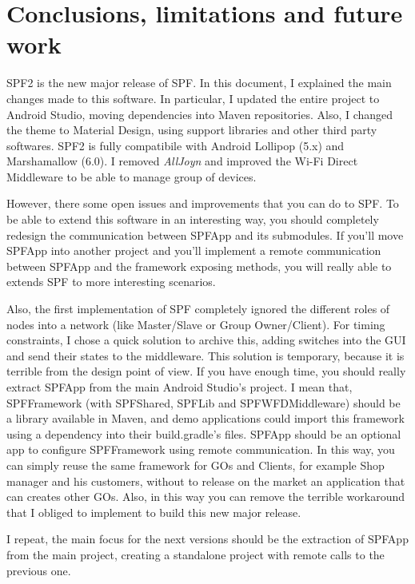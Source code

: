 \chapter{Conclusions, limitations and future work}
\label{conclusion}

SPF2 is the new major release of SPF. In this document, I explained the main changes made to this software. In particular, I updated the entire project to Android Studio, moving dependencies into Maven repositories. Also, I changed the theme to Material Design, using support libraries and other third party softwares. SPF2 is fully compatibile with Android Lollipop (5.x) and Marshamallow (6.0). I removed \emph{AllJoyn} and improved the Wi-Fi Direct Middleware to be able to manage group of devices.

However, there some open issues and improvements that you can do to SPF. To be able to extend this software in an interesting way, you should completely redesign the communication between SPFApp and its submodules. If you'll move SPFApp into another project and you'll implement a remote communication between SPFApp and the framework exposing methods, you will really able to extends SPF to more interesting scenarios.

Also, the first implementation of SPF completely ignored the different roles of nodes into a network (like Master/Slave or Group Owner/Client). For timing constraints, I chose a quick solution to archive this, adding switches into the GUI and send their states to the middleware. This solution is temporary, because it is terrible from the design point of view. If you have enough time, you should really extract \textsf{SPFApp} from the main Android Studio's project. I mean that, \textsf{SPFFramework} (with \textsf{SPFShared}, \textsf{SPFLib} and \textsf{SPFWFDMiddleware}) should be a library available in Maven, and demo applications could import this framework using a dependency into their \textsf{build.gradle}'s files. \textsf{SPFApp} should be an optional app to configure \textsf{SPFFramework} using remote communication. In this way, you can simply reuse the same framework for GOs and Clients, for example Shop manager and his customers, without to release on the market an application that can creates other GOs. Also, in this way you can remove the terrible workaround that I obliged to implement to build this new major release.

I repeat, the main focus for the next versions should be the extraction of \textsf{SPFApp} from the main project, creating a standalone project with remote calls to the previous one.



